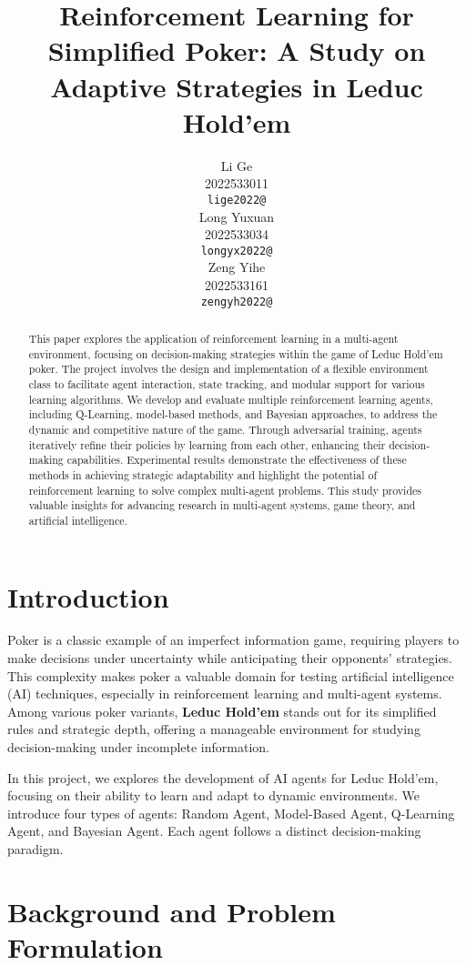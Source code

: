 \documentclass{article}
\title{Reinforcement Learning for Simplified Poker: A Study on Adaptive Strategies in Leduc Hold’em}
\author{
  Li Ge \\
  2022533011 \\
  \texttt{lige2022@} \\
  \And
  Long Yuxuan\\
  2022533034 \\
  \texttt{longyx2022@} \\
  \And
  Zeng Yihe\\
  2022533161  \\
  \texttt{zengyh2022@} \\
}
\begin{document}
\maketitle

\begin{abstract}
    This paper explores the application of reinforcement learning in a multi-agent environment, focusing on decision-making strategies within the game of Leduc Hold’em poker. The project involves the design and implementation of a flexible environment class to facilitate agent interaction, state tracking, and modular support for various learning algorithms. We develop and evaluate multiple reinforcement learning agents, including Q-Learning, model-based methods, and Bayesian approaches, to address the dynamic and competitive nature of the game. Through adversarial training, agents iteratively refine their policies by learning from each other, enhancing their decision-making capabilities. Experimental results demonstrate the effectiveness of these methods in achieving strategic adaptability and highlight the potential of reinforcement learning to solve complex multi-agent problems. This study provides valuable insights for advancing research in multi-agent systems, game theory, and artificial intelligence.
\end{abstract}

\section{Introduction}
Poker is a classic example of an imperfect information game, requiring players to make decisions under uncertainty while anticipating their opponents’ strategies. This complexity makes poker a valuable domain for testing artificial intelligence (AI) techniques, especially in reinforcement learning and multi-agent systems. Among various poker variants, \textbf{Leduc Hold’em} stands out for its simplified rules and strategic depth, offering a manageable environment for studying decision-making under incomplete information.

In this project, we explores the development of AI agents for Leduc Hold’em, focusing on their ability to learn and adapt to dynamic environments. We introduce four types of agents: Random Agent, Model-Based Agent, Q-Learning Agent, and Bayesian Agent. Each agent follows a distinct decision-making paradigm.

\section{Background and Problem Formulation}
\end{document}
